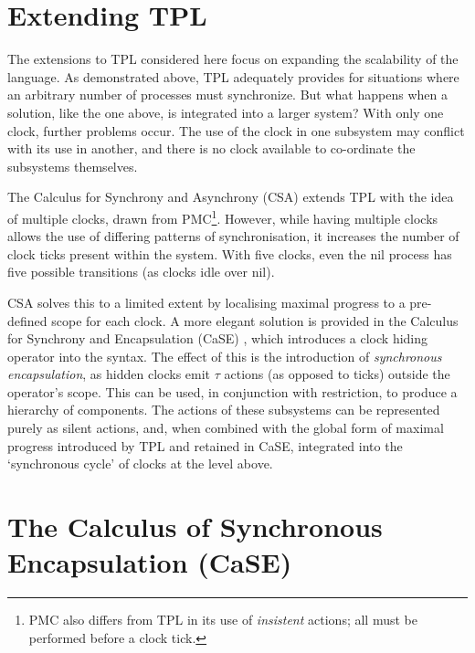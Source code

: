 \section{Extending TPL}
\label{tplext}

The extensions to TPL considered here focus on expanding the
scalability of the language.  As demonstrated above, TPL adequately
provides for situations where an arbitrary number of processes must
synchronize.  But what happens when a solution, like the one above, is
integrated into a larger system?  With only one clock, further
problems occur.  The use of the clock in one subsystem may conflict
with its use in another, and there is no clock available to
co-ordinate the subsystems themselves.

The Calculus for Synchrony and Asynchrony (CSA) \cite{csa} extends TPL
with the idea of multiple clocks, drawn from PMC\footnote{PMC also
  differs from TPL in its use of \emph{insistent} actions; all must be
  performed before a clock tick.}\cite{pmc}. However, while having
multiple clocks allows the use of differing patterns of
synchronisation, it increases the number of clock ticks present within
the system.  With five clocks, even the nil process has five possible
transitions (as clocks idle over nil).

CSA solves this to a limited extent by localising maximal progress to
a pre-defined scope for each clock.  A more elegant solution is
provided in the Calculus for Synchrony and Encapsulation (CaSE)
\cite{CaSE}, which introduces a clock hiding operator into the syntax.
The effect of this is the introduction of \emph{synchronous
  encapsulation}, as hidden clocks emit $\tau$ actions (as opposed to
ticks) outside the operator's scope.  This can be used, in conjunction
with restriction, to produce a hierarchy of components.  The actions
of these subsystems can be represented purely as silent actions, and,
when combined with the global form of maximal progress introduced by
TPL and retained in CaSE, integrated into the `synchronous cycle'
\cite{CaSE} of clocks at the level above.

\section{The Calculus of Synchronous Encapsulation (CaSE)}
\label{case}

